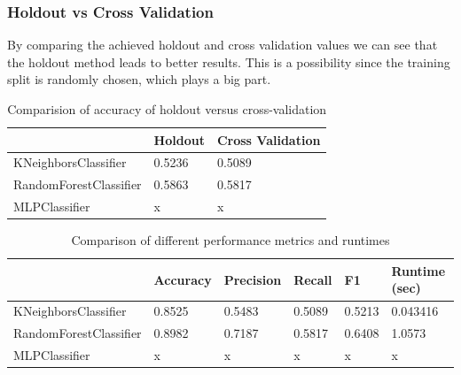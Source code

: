 \documentclass{article}
\begin{document}
\subsubsection{Holdout vs Cross Validation}
By comparing the achieved holdout and cross validation values we can see that the holdout method leads to better results. This is a possibility since the training split is randomly chosen, which plays a big part.

\begin{table}[h]
\begin{center}
\begin{tabular}{|l|l|l|}
\hline
                       & Holdout & Cross Validation \\ \hline
KNeighborsClassifier   & 0.5236  & 0.5089           \\ \hline
RandomForestClassifier & 0.5863  & 0.5817           \\ \hline
MLPClassifier          & x  & x           \\ \hline
\end{tabular}
\caption{Comparision of accuracy of holdout versus cross-validation}
\end{center}
\end{table}

\begin{table}[h]
\begin{center}
\begin{tabular}{|l|l|l|l|l|l|}
\hline
                       & Accuracy & Precision & Recall & F1     & Runtime (sec) \\ \hline
KNeighborsClassifier   & 0.8525   & 0.5483  & 0.5089 & 0.5213 & 0.043416        \\ \hline
RandomForestClassifier & 0.8982   & 0.7187    & 0.5817   & 0.6408   & 1.0573        \\ \hline
MLPClassifier          & x   & x    & x   & x   & x        \\ \hline
\end{tabular}
\caption{Comparison of different performance metrics and runtimes}
\end{center}
\end{table}
\end{document}
